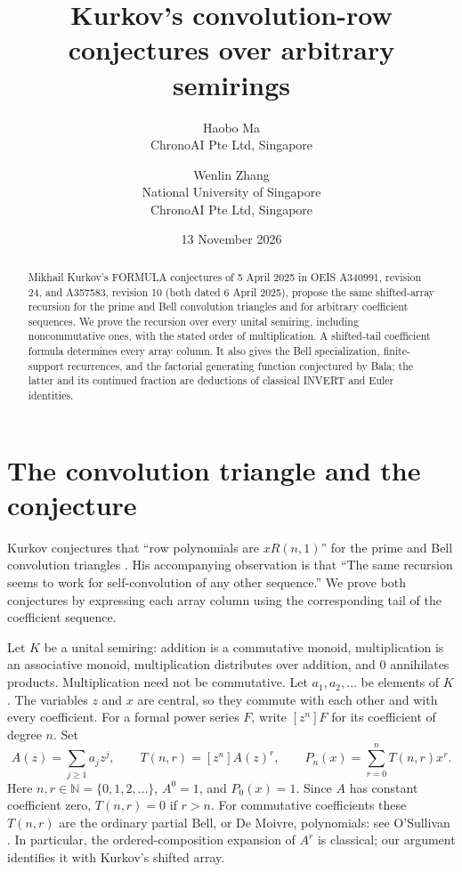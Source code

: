 \documentclass[11pt]{article}
\title{Kurkov's convolution-row conjectures over arbitrary semirings}
\author{Haobo Ma\\\small ChronoAI Pte Ltd, Singapore
\and Wenlin Zhang\\\small National University of Singapore\\\small ChronoAI Pte Ltd, Singapore}
\date{13 November 2026}
\newcommand{\N}{\mathbb{N}}
\begin{document}
\maketitle
\begin{abstract}
Mikhail Kurkov's FORMULA conjectures of 5 April 2025 in OEIS A340991,
revision 24, and A357583, revision 10 (both dated 6 April 2025), propose
the same shifted-array recursion for the prime and Bell convolution
triangles and for arbitrary coefficient sequences. We prove the recursion
over every unital semiring, including noncommutative ones, with the stated
order of multiplication. A shifted-tail coefficient formula determines
every array column. It also gives the Bell specialization, finite-support
recurrences, and the factorial generating function conjectured by Bala;
the latter and its continued fraction are deductions of classical INVERT
and Euler identities.
\end{abstract}

\section{The convolution triangle and the conjecture}
Kurkov conjectures that ``row polynomials are $xR(n,1)$'' for the prime
and Bell convolution triangles \cite{a340991,bell}. His accompanying
observation is that ``The same recursion seems to work for self-convolution
of any other sequence.'' We prove both conjectures by expressing each
array column using the corresponding tail of the coefficient sequence.

Let $K$ be a unital semiring: addition is a commutative monoid, multiplication
is an associative monoid, multiplication distributes over addition, and
$0$ annihilates products. Multiplication need not be commutative. Let
$a_1,a_2,\ldots$ be elements of $K$. The variables $z$ and $x$ are central,
so they commute with each other and with every coefficient. For a formal
power series $F$, write $[z^n]F$ for its coefficient of degree $n$. Set
\begin{equation}\label{eq:rows}
 A(z)=\sum_{j\geq1}a_jz^j,\qquad
 T(n,r)=[z^n]A(z)^r,\qquad
 P_n(x)=\sum_{r=0}^{n}T(n,r)x^r .
\end{equation}
Here $n,r\in\N=\{0,1,2,\ldots\}$, $A^0=1$, and $P_0(x)=1$.
Since $A$ has constant coefficient zero, $T(n,r)=0$ if $r>n$.
For commutative coefficients these $T(n,r)$ are the ordinary partial Bell,
or De Moivre, polynomials: see O'Sullivan \cite[Definition 1.1 and
equations (2.4), (2.6)]{osullivan}. In particular, the ordered-composition
expansion of $A^r$ is classical; our argument identifies it with Kurkov's
shifted array.
\end{document}
